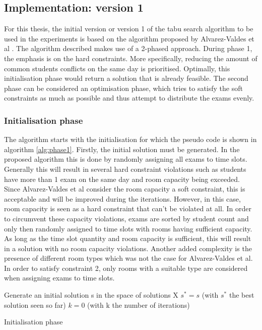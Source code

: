 \subsection{Implementation: version 1}
For this thesis, the initial version or version 1 of the tabu search algorithm to be used in the experiments is based on the algorithm proposed by Alvarez-Valdes et al \cite{alvarez1997}. The algorithm described makes use of a 2-phased approach. During phase 1, the emphasis is on the hard constraints. More specifically, reducing the amount of common students conflicts on the same day is prioritised. Optimally, this initialisation phase would return a solution that is already feasible. The second phase can be considered an optimisation phase, which tries to satisfy the soft constraints as much as possible and thus attempt to distribute the exams evenly.

\subsubsection{Initialisation phase}
The algorithm starts with the initialisation for which the pseudo code is shown in algorithm \ref{alg:phase1}. Firstly, the initial solution must be generated. In the proposed algorithm this is done by randomly assigning all exams to time slots. Generally this will result in several hard constraint violations such as students have more than 1 exam on the same day and room capacity being exceeded. Since Alvarez-Valdes et al consider the room capacity a soft constraint, this is acceptable and will be improved during the iterations. However, in this case, room capacity is seen as a hard constraint that can't be violated at all. In order to circumvent these capacity violations, exams are sorted by student count and only then randomly assigned to time slots with rooms having sufficient capacity. As long as the time slot quantity and room capacity is sufficient, this will result in a solution with no room capacity violations. Another added complexity is the presence of different room types which was not the case for Alvarez-Valdes et al. In order to satisfy constraint 2, only rooms with a suitable type are considered when assigning exams to time slots.

\begin{algorithm}
 Generate an initial solution s in the space of solutions X\;
 $s^* = s$ (with $s^*$ the best solution seen so far)\;
 $k = 0$ (with k the number of iterations)\;

\caption{Initialisation phase}
\label{alg:phase1}
\end{algorithm}

